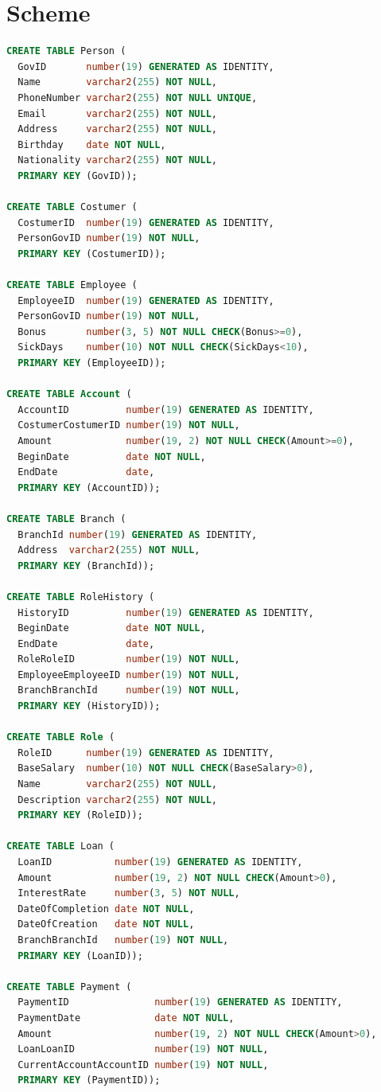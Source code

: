 \documentclass[a4paper, 10pt]{article}
\begin{document}
\section{Scheme}
\begin{lstlisting}[language=SQL]
CREATE TABLE Person (
  GovID       number(19) GENERATED AS IDENTITY, 
  Name        varchar2(255) NOT NULL, 
  PhoneNumber varchar2(255) NOT NULL UNIQUE, 
  Email       varchar2(255) NOT NULL, 
  Address     varchar2(255) NOT NULL, 
  Birthday    date NOT NULL, 
  Nationality varchar2(255) NOT NULL, 
  PRIMARY KEY (GovID));

CREATE TABLE Costumer (
  CostumerID  number(19) GENERATED AS IDENTITY, 
  PersonGovID number(19) NOT NULL, 
  PRIMARY KEY (CostumerID));

CREATE TABLE Employee (
  EmployeeID  number(19) GENERATED AS IDENTITY, 
  PersonGovID number(19) NOT NULL, 
  Bonus       number(3, 5) NOT NULL CHECK(Bonus>=0), 
  SickDays    number(10) NOT NULL CHECK(SickDays<10), 
  PRIMARY KEY (EmployeeID));

CREATE TABLE Account (
  AccountID          number(19) GENERATED AS IDENTITY, 
  CostumerCostumerID number(19) NOT NULL, 
  Amount             number(19, 2) NOT NULL CHECK(Amount>=0), 
  BeginDate          date NOT NULL, 
  EndDate            date, 
  PRIMARY KEY (AccountID));

CREATE TABLE Branch (
  BranchId number(19) GENERATED AS IDENTITY, 
  Address  varchar2(255) NOT NULL, 
  PRIMARY KEY (BranchId));

CREATE TABLE RoleHistory (
  HistoryID          number(19) GENERATED AS IDENTITY, 
  BeginDate          date NOT NULL, 
  EndDate            date, 
  RoleRoleID         number(19) NOT NULL, 
  EmployeeEmployeeID number(19) NOT NULL, 
  BranchBranchId     number(19) NOT NULL, 
  PRIMARY KEY (HistoryID));

CREATE TABLE Role (
  RoleID      number(19) GENERATED AS IDENTITY, 
  BaseSalary  number(10) NOT NULL CHECK(BaseSalary>0), 
  Name        varchar2(255) NOT NULL, 
  Description varchar2(255) NOT NULL, 
  PRIMARY KEY (RoleID));

CREATE TABLE Loan (
  LoanID           number(19) GENERATED AS IDENTITY, 
  Amount           number(19, 2) NOT NULL CHECK(Amount>0), 
  InterestRate     number(3, 5) NOT NULL, 
  DateOfCompletion date NOT NULL, 
  DateOfCreation   date NOT NULL, 
  BranchBranchId   number(19) NOT NULL, 
  PRIMARY KEY (LoanID));

CREATE TABLE Payment (
  PaymentID               number(19) GENERATED AS IDENTITY, 
  PaymentDate             date NOT NULL, 
  Amount                  number(19, 2) NOT NULL CHECK(Amount>0), 
  LoanLoanID              number(19) NOT NULL, 
  CurrentAccountAccountID number(19) NOT NULL, 
  PRIMARY KEY (PaymentID));


\end{lstlisting}
\end{document}
